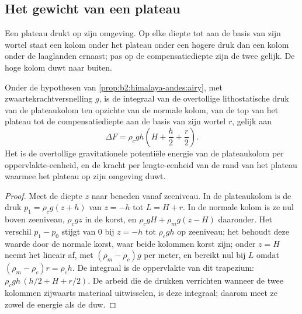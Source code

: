 \subsection{Het gewicht van een plateau}

Een plateau drukt op zijn omgeving. Op elke diepte tot aan de basis van zijn wortel staat een kolom
onder het plateau onder een hogere druk dan een kolom onder de laaglanden ernaast;
pas op de compensatiediepte zijn de twee gelijk. De hoge kolom duwt naar buiten.

\begin{proposition}\label{prop:b2:himalaya-andes:gpe}
Onder de hypothesen van \cref{prop:b2:himalaya-andes:airy}, met zwaartekrachtversnelling $g$, is de integraal van
de overtollige lithostatische druk van de plateaukolom ten opzichte van de normale kolom, van de top
van het plateau tot de compensatiediepte aan de basis van zijn wortel $r$, gelijk aan
\[
  \Delta F = \rho_c g h \left(H + \frac{h}{2} + \frac{r}{2}\right) .
\]
Het is de overtollige gravitationele potentiële energie van de plateaukolom per oppervlakte-eenheid, en de
kracht per lengte-eenheid van de rand van het plateau waarmee het plateau op zijn
omgeving duwt.
\end{proposition}

\begin{proof}
Meet de diepte $z$ naar beneden vanaf zeeniveau. In de plateaukolom is de druk $p_1 =
\rho_c g (z + h)$ van $z = -h$ tot $L = H + r$. In de normale kolom is ze nul boven
zeeniveau, $\rho_c g z$ in de korst, en $\rho_c g H + \rho_m g (z - H)$ daaronder. Het verschil $p_1
- p_0$ stijgt van 0 bij $z = -h$ tot $\rho_c g h$ op zeeniveau; het behoudt deze waarde door de
normale korst, waar beide kolommen korst zijn; onder $z = H$ neemt het lineair af, met
$(\rho_m - \rho_c) g$ per meter, en bereikt nul bij $L$ omdat $(\rho_m - \rho_c) r = \rho_c
h$. De integraal is de oppervlakte van dit trapezium: $\rho_c g h\,(h/2 + H + r/2)$. De arbeid die
de drukken verrichten wanneer de twee kolommen zijwaarts materiaal uitwisselen, is deze integraal; daarom
meet ze zowel de energie als de duw.
\end{proof}

